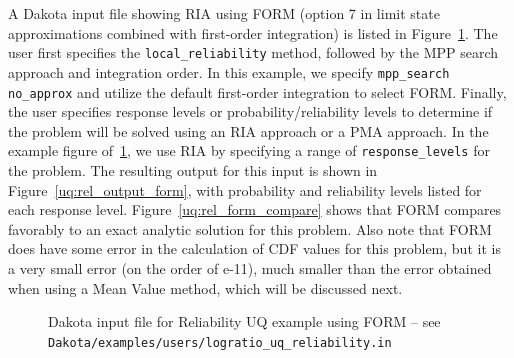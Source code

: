 A Dakota input file showing RIA using FORM (option 7 in limit state
approximations combined with first-order integration) is listed in
Figure~\ref{uq:rel_input_form}.
The user first specifies the \texttt{local\_reliability}
method, followed by the MPP search approach and integration order. In
this example, we specify \texttt{mpp\_search no\_approx} and utilize
the default first-order integration to select FORM. Finally, the user
specifies response levels or probability/reliability levels to
determine if the problem will be solved using an RIA approach or a PMA
approach. In the example figure of~\ref{uq:rel_input_form}, we use
RIA by specifying a range of \texttt{response\_levels} for the
problem. The resulting output for this input is shown in
Figure~\ref{uq:rel_output_form}, with probability and reliability
levels listed for each response level. Figure~\ref{uq:rel_form_compare} 
shows that FORM compares favorably to an exact analytic solution for
this problem. Also note that FORM does have some error in the
calculation of CDF values for this problem, but it is a very small
error (on the order of e-11), much smaller than the error obtained
when using a Mean Value method, which will be discussed next.
\begin{figure}[htbp!]
  \centering
  \begin{bigbox}
    \begin{small}
    \end{small}
  \end{bigbox}
\caption{Dakota input file for Reliability UQ example using FORM --
see \texttt{Dakota/examples/users/logratio\_uq\_reliability.in} }
\label{uq:rel_input_form}
\end{figure}


